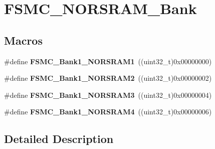 \hypertarget{group___f_s_m_c___n_o_r_s_r_a_m___bank}{\section{F\-S\-M\-C\-\_\-\-N\-O\-R\-S\-R\-A\-M\-\_\-\-Bank}
\label{group___f_s_m_c___n_o_r_s_r_a_m___bank}
}
\subsection*{Macros}
\begin{DoxyCompactItemize}
\item 
\hypertarget{group___f_s_m_c___n_o_r_s_r_a_m___bank_ga514a05828041fa1a13d464c9e4a0a4a9}{\#define {\bfseries F\-S\-M\-C\-\_\-\-Bank1\-\_\-\-N\-O\-R\-S\-R\-A\-M1}~((uint32\-\_\-t)0x00000000)}\label{group___f_s_m_c___n_o_r_s_r_a_m___bank_ga514a05828041fa1a13d464c9e4a0a4a9}

\item 
\hypertarget{group___f_s_m_c___n_o_r_s_r_a_m___bank_gaef52862c652370b9a658478d275dd956}{\#define {\bfseries F\-S\-M\-C\-\_\-\-Bank1\-\_\-\-N\-O\-R\-S\-R\-A\-M2}~((uint32\-\_\-t)0x00000002)}\label{group___f_s_m_c___n_o_r_s_r_a_m___bank_gaef52862c652370b9a658478d275dd956}

\item 
\hypertarget{group___f_s_m_c___n_o_r_s_r_a_m___bank_ga151b02506a318ac77382b52f3b5e16f4}{\#define {\bfseries F\-S\-M\-C\-\_\-\-Bank1\-\_\-\-N\-O\-R\-S\-R\-A\-M3}~((uint32\-\_\-t)0x00000004)}\label{group___f_s_m_c___n_o_r_s_r_a_m___bank_ga151b02506a318ac77382b52f3b5e16f4}

\item 
\hypertarget{group___f_s_m_c___n_o_r_s_r_a_m___bank_ga1083572834aa084d21e6698c280f8f74}{\#define {\bfseries F\-S\-M\-C\-\_\-\-Bank1\-\_\-\-N\-O\-R\-S\-R\-A\-M4}~((uint32\-\_\-t)0x00000006)}\label{group___f_s_m_c___n_o_r_s_r_a_m___bank_ga1083572834aa084d21e6698c280f8f74}

\end{DoxyCompactItemize}


\subsection{Detailed Description}
